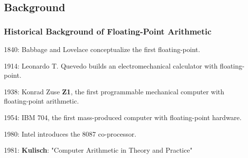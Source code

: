 \graphicspath{{../../../PhD/paper_factory/thesis_louis/Chapter2/Figs/}{./figs/}}
\subsection{Background}

\begin{frame}[t]
\frametitle{Historical Background of Floating-Point Arithmetic}


\newcommand{\startyear}{1840}
\newcommand{\endyear}{2025}
\newcommand{\timelineLength}{185}

\tiny
{}
\scriptsize
\vspace{-6mm}
\begin{myitemize}
\item<1> 1840: Babbage and Lovelace conceptualize the first floating-point.
\item<2> 1914: Leonardo T. Quevedo builds an electromechanical calculator with floating-point.
\item<3> 1938: Konrad Zuse \textbf{Z1}, the first programmable mechanical computer with floating-point arithmetic.
\item<4> 1954: IBM 704, the first mass-produced computer with floating-point hardware.
\item<5> 1980: Intel introduces the 8087 co-processor.
\item<6-> 1981: \textbf{Kulisch}: "Computer Arithmetic in Theory and Practice"

\end{myitemize}
\end{frame}
